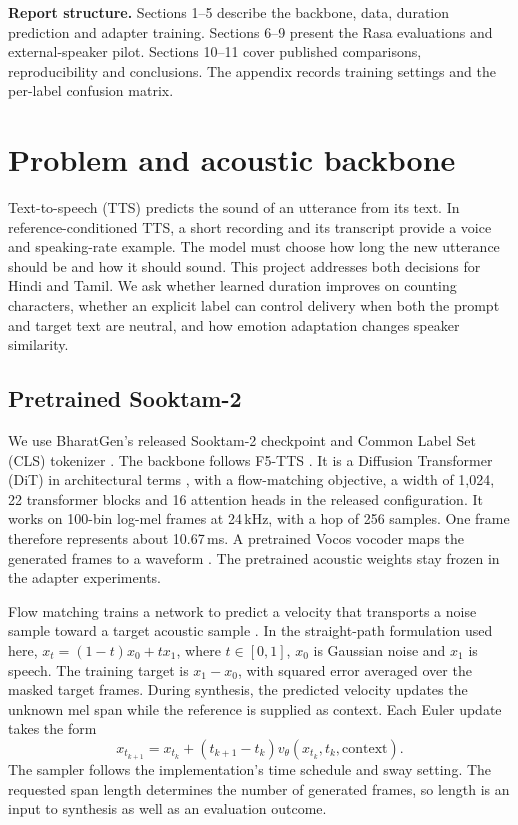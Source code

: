 \documentclass[11pt,a4paper]{article}
\newcommand{\sectionpage}[1]{\clearpage\section{#1}}
\begin{document}
\vspace{4mm}
\noindent\colorbox{wash}{\parbox{\dimexpr\linewidth-2\fboxsep\relax}{\small
\textbf{Report structure.} Sections 1--5 describe the backbone, data, duration prediction and adapter training. Sections 6--9 present the Rasa evaluations and external-speaker pilot. Sections 10--11 cover published comparisons, reproducibility and conclusions. The appendix records training settings and the per-label confusion matrix.}}

\sectionpage{Problem and acoustic backbone}
Text-to-speech (TTS) predicts the sound of an utterance from its text. In reference-conditioned TTS, a short recording and its transcript provide a voice and speaking-rate example. The model must choose how long the new utterance should be and how it should sound. This project addresses both decisions for Hindi and Tamil. We ask whether learned duration improves on counting characters, whether an explicit label can control delivery when both the prompt and target text are neutral, and how emotion adaptation changes speaker similarity.

\subsection{Pretrained Sooktam-2}
We use BharatGen's released Sooktam-2 checkpoint and Common Label Set (CLS) tokenizer \cite{sooktam}. The backbone follows F5-TTS \cite{f5}. It is a Diffusion Transformer (DiT) in architectural terms \cite{dit}, with a flow-matching objective, a width of 1,024, 22 transformer blocks and 16 attention heads in the released configuration. It works on 100-bin log-mel frames at 24\,kHz, with a hop of 256 samples. One frame therefore represents about 10.67\,ms. A pretrained Vocos vocoder maps the generated frames to a waveform \cite{vocos}. The pretrained acoustic weights stay frozen in the adapter experiments.

Flow matching trains a network to predict a velocity that transports a noise sample toward a target acoustic sample \cite{flow}. In the straight-path formulation used here, \(x_t=(1-t)x_0+tx_1\), where \(t\in[0,1]\), \(x_0\) is Gaussian noise and \(x_1\) is speech. The training target is \(x_1-x_0\), with squared error averaged over the masked target frames. During synthesis, the predicted velocity updates the unknown mel span while the reference is supplied as context. Each Euler update takes the form
\[
 x_{t_{k+1}} = x_{t_k}+(t_{k+1}-t_k)v_\theta(x_{t_k},t_k,\text{context}).
\]
The sampler follows the implementation's time schedule and sway setting. The requested span length determines the number of generated frames, so length is an input to synthesis as well as an evaluation outcome.
\end{document}
